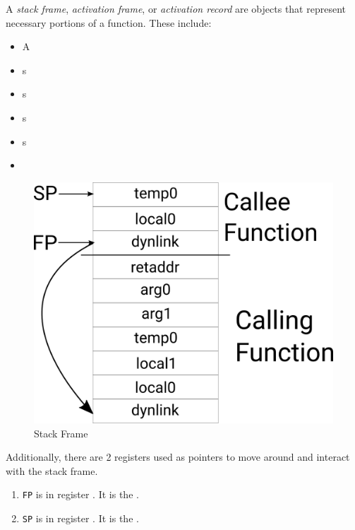 \begin{definition}\label{def:Stack_Frame}
  A \emph{stack frame}, \emph{activation frame}, or \emph{activation record} are objects that represent necessary portions of a function.
  These include:
  \begin{itemize}[noitemsep]
  \item A 
  \item {}s
  \item {}s
  \item {}s
  \item {}s
  \item {}
  \end{itemize}

  \begin{figure}[h!]
    \centering
    \includegraphics[scale=0.65]{./Drawings/EDAN65-Compilers/Stack_Frame.png}
    \caption{Stack Frame}
    \label{fig:Stack_Frame}
  \end{figure}

  Additionally, there are 2 registers used as pointers to move around and interact with the stack frame.
  \begin{enumerate}[noitemsep]
  \item \texttt{FP} is in register \rbpRegister{}. It is the .
  \item \texttt{SP} is in register \rspRegister{}. It is the .
  \end{enumerate}
\end{definition}

